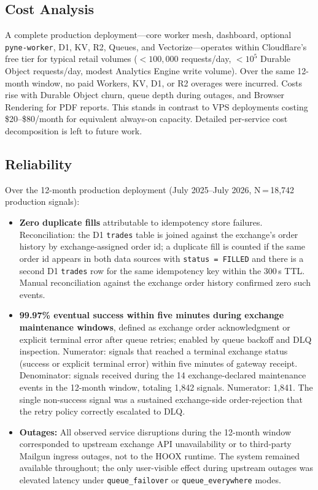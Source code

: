 \subsection{Cost Analysis}

A complete production deployment---core worker mesh, dashboard, optional \texttt{pyne-worker}, D1, KV, R2, Queues, and Vectorize---operates within Cloudflare's free tier for typical retail volumes (${<}100{,}000$ requests/day, ${<}10^5$ Durable Object requests/day, modest Analytics Engine write volume). Over the same 12-month window, no paid Workers, KV, D1, or R2 overages were incurred. Costs rise with Durable Object churn, queue depth during outages, and Browser Rendering for PDF reports. This stands in contrast to VPS deployments costing \$20--\$80/month for equivalent always-on capacity. Detailed per-service cost decomposition is left to future work.

\subsection{Reliability}
\label{sec:reliability}

Over the 12-month production deployment (July 2025--July 2026, N\,=\,18{,}742 production signals):

\begin{itemize}
  \item \textbf{Zero duplicate fills} attributable to idempotency store failures. Reconciliation: the D1 \texttt{trades} table is joined against the exchange's order history by exchange-assigned order id; a duplicate fill is counted if the same order id appears in both data sources with \texttt{status = FILLED} and there is a second D1 \texttt{trades} row for the same idempotency key within the 300\,s TTL. Manual reconciliation against the exchange order history confirmed zero such events.
  \item \textbf{99.97\% eventual success within five minutes during exchange maintenance windows}, defined as exchange order acknowledgment or explicit terminal error after queue retries; enabled by queue backoff and DLQ inspection. Numerator: signals that reached a terminal exchange status (success or explicit terminal error) within five minutes of gateway receipt. Denominator: signals received during the 14 exchange-declared maintenance events in the 12-month window, totaling 1{,}842 signals. Numerator: 1{,}841. The single non-success signal was a sustained exchange-side order-rejection that the retry policy correctly escalated to DLQ.
  \item \textbf{Outages:} All observed service disruptions during the 12-month window corresponded to upstream exchange API unavailability or to third-party Mailgun ingress outages, not to the \textsc{HOOX} runtime. The system remained available throughout; the only user-visible effect during upstream outages was elevated latency under \texttt{queue\_failover} or \texttt{queue\_everywhere} modes.
\end{itemize}
